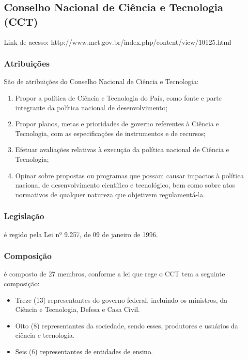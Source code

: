 \subsection*{Conselho Nacional de Ciência e Tecnologia (CCT)}

Link de acesso: http://www.mct.gov.br/index.php/content/view/10125.html

\subsubsection*{Atribuições}

São de atribuições do Conselho Nacional de Ciência e
Tecnologia:

\begin{enumerate}
\item 
Propor a política de Ciência e Tecnologia do País, como fonte e
parte integrante da política nacional de desenvolvimento;
\item 
Propor planos, metas e prioridades de governo referentes à Ciência e
Tecnologia, com as especificações de instrumentos e de recursos;
\item 
Efetuar avaliações relativas à execução da política
nacional de Ciência e Tecnologia;
\item 
Opinar sobre propostas ou programas que possam causar impactos à
política nacional de desenvolvimento científico e tecnológico,
bem como sobre atos normativos de qualquer natureza que objetivem
regulamentá-la.
\end{enumerate}

\subsubsection*{Legislação}

é regido pela Lei nº 9.257, de 09 de janeiro de
1996.

\subsubsection*{Composição}

é composto de 27 membros, conforme a lei que rege o CCT tem a seguinte
composição:

\begin{itemize}
\item 
Treze (13) representantes do governo federal, incluindo os ministros, da
Ciência e Tecnologia, Defesa e Casa Civil.
\item 
Oito (8) representantes da sociedade, sendo esses, produtores e
usuários da ciência e tecnologia.
\item 
Seis (6) representantes de entidades de ensino.
\end{itemize}
\newpage
